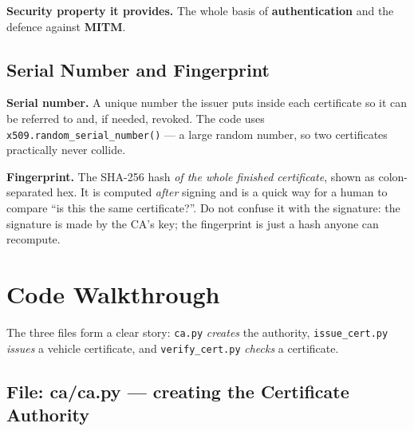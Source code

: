 \documentclass[11pt,a4paper]{article}
\begin{document}
\textbf{Security property it provides.} The whole basis of
\textbf{authentication} and the defence against \textbf{MITM}.

\subsection{Serial Number and Fingerprint}
\textbf{Serial number.} A unique number the issuer puts inside each certificate
so it can be referred to and, if needed, revoked. The code uses
\texttt{x509.random\_serial\_number()} --- a large random number, so two
certificates practically never collide.

\textbf{Fingerprint.} The SHA-256 hash \emph{of the whole finished certificate},
shown as colon-separated hex. It is computed \emph{after} signing and is a quick
way for a human to compare ``is this the same certificate?''. Do not confuse it
with the signature: the signature is made by the CA's key; the fingerprint is
just a hash anyone can recompute.

\section{Code Walkthrough}

The three files form a clear story: \texttt{ca.py} \emph{creates} the authority,
\texttt{issue\_cert.py} \emph{issues} a vehicle certificate, and
\texttt{verify\_cert.py} \emph{checks} a certificate.

\subsection{File: ca/ca.py --- creating the Certificate Authority}
\end{document}
